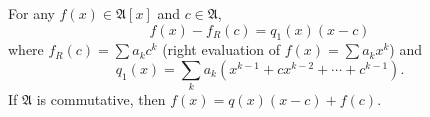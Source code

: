 For any $f(x) \in \mathfrak{A}[x]$ and $c \in \mathfrak{A}$,
$$f(x) - f_R(c) = q_1(x)(x - c)$$
where $f_R(c) = \sum a_k c^k$ (right evaluation of $f(x) = \sum a_k x^k$) and
$$q_1(x) = \sum_{k} a_k (x^{k-1} + cx^{k-2} + \cdots + c^{k-1}).$$
If $\mathfrak{A}$ is commutative, then $f(x) = q(x)(x-c) + f(c)$.

